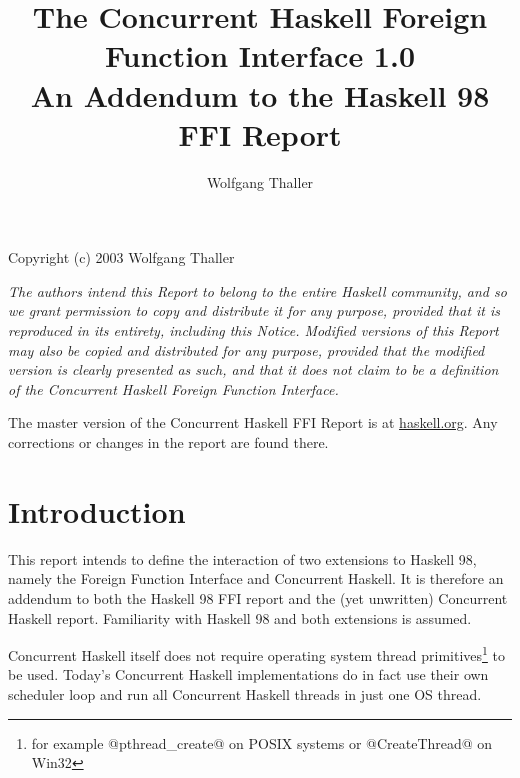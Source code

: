 \documentclass[a4paper,twoside]{article}
\newcommand{\clearemptydoublepage}{%
  \newpage{\pagestyle{empty}\cleardoublepage}}
\begin{document}
\pagestyle{headings}

\title{%
  The Concurrent Haskell Foreign Function Interface 1.0\\
  An Addendum to the Haskell 98 FFI Report%
}

\author{Wolfgang Thaller}
\date{}
\maketitle
\par\vfill
\noindent
Copyright (c) 2003 Wolfgang Thaller
\par\noindent
\emph{The authors intend this Report to belong to the entire Haskell
  community, and so we grant permission to copy and distribute it for any
  purpose, provided that it is reproduced in its entirety, including this
  Notice.  Modified versions of this Report may also be copied and distributed
  for any purpose, provided that the modified version is clearly presented as
  such, and that it does not claim to be a definition of the Concurrent Haskell
  Foreign Function Interface.}
\par\bigskip\noindent
The master version of the Concurrent Haskell FFI Report is at \url{haskell.org}. Any
corrections or changes in the report are found there.
\thispagestyle{empty}


\clearemptydoublepage
{}
\tableofcontents

\clearemptydoublepage

\makeatactive

%


\section{Introduction}

This report intends to define the interaction of two extensions to Haskell 98, namely
the Foreign Function Interface and Concurrent Haskell. It is therefore an addendum
to both the Haskell 98 FFI report and the (yet unwritten) Concurrent Haskell report.
Familiarity with Haskell 98 and both extensions is assumed.

Concurrent Haskell itself does not require operating system thread primitives\footnote{for
example @pthread\_create@ on POSIX systems or @CreateThread@ on Win32}
to be used. Today's Concurrent Haskell implementations do in fact use their own
scheduler loop and run all Concurrent Haskell threads in just one OS thread.
\end{document}
